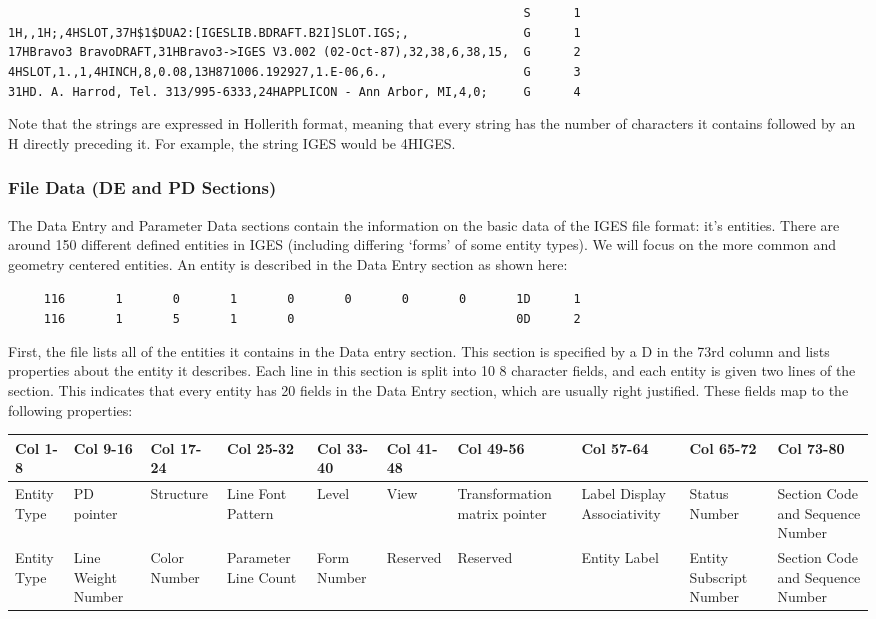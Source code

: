 \texttt{~~~~~~~~~~~~~~~~~~~~~~~~~~~~~~~~~~~~~~~~~~~~~~~~~~~~~~~~~~~~~~~~~~~~~~~~S~~~~~~1}\\\texttt{1H,,1H;,4HSLOT,37H\$1\$DUA2:{[}IGESLIB.BDRAFT.B2I{]}SLOT.IGS;,~~~~~~~~~~~~~~~~G~~~~~~1}\\\texttt{17HBravo3~BravoDRAFT,31HBravo3-\textgreater{}IGES~V3.002~(02-Oct-87),32,38,6,38,15,~~G~~~~~~2}\\\texttt{4HSLOT,1.,1,4HINCH,8,0.08,13H871006.192927,1.E-06,6.,~~~~~~~~~~~~~~~~~~~G~~~~~~3}\\\texttt{31HD.~A.~Harrod,~Tel.~313/995-6333,24HAPPLICON~-~Ann~Arbor,~MI,4,0;~~~~~G~~~~~~4}

Note that the strings are expressed in Hollerith format, meaning that
every string has the number of characters it contains followed by an H
directly preceding it. For example, the string IGES would be 4HIGES.

\subsubsection{File Data (DE and PD
Sections)}\label{file-data-de-and-pd-sections}

The Data Entry and Parameter Data sections contain the information on
the basic data of the IGES file format: it's entities. There are around
150 different defined entities in IGES (including differing `forms' of
some entity types). We will focus on the more common and geometry
centered entities. An entity is described in the Data Entry section as
shown here:

\texttt{~~~~~116~~~~~~~1~~~~~~~0~~~~~~~1~~~~~~~0~~~~~~~0~~~~~~~0~~~~~~~0~~~~~~~1D~~~~~~1}\\\texttt{~~~~~116~~~~~~~1~~~~~~~5~~~~~~~1~~~~~~~0~~~~~~~~~~~~~~~~~~~~~~~~~~~~~~~0D~~~~~~2}

First, the file lists all of the entities it contains in the Data entry
section. This section is specified by a D in the 73rd column and lists
properties about the entity it describes. Each line in this section is
split into 10 8 character fields, and each entity is given two lines of
the section. This indicates that every entity has 20 fields in the Data
Entry section, which are usually right justified. These fields map to
the following properties:

\begin{longtable}[c]{@{}llllllllll@{}}
\toprule
Col 1-8 & Col 9-16 & Col 17-24 & Col 25-32 & Col 33-40 & Col 41-48 & Col
49-56 & Col 57-64 & Col 65-72 & Col 73-80\tabularnewline
\midrule
\endhead
Entity Type & PD pointer & Structure & Line Font Pattern & Level & View
& Transformation matrix pointer & Label Display Associativity & Status
Number & Section Code and Sequence Number\tabularnewline
Entity Type & Line Weight Number & Color Number & Parameter Line Count &
Form Number & Reserved & Reserved & Entity Label & Entity Subscript
Number & Section Code and Sequence Number\tabularnewline
\bottomrule
\end{longtable}


